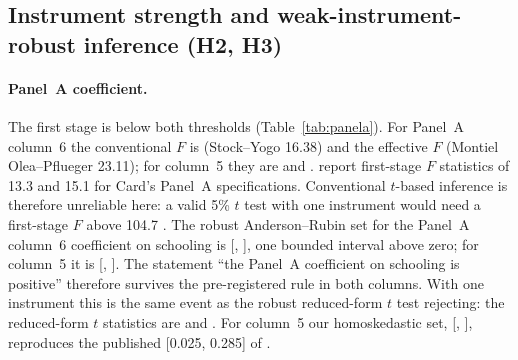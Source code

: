 \documentclass[11pt]{article}
\begin{document}
\subsection{Instrument strength and weak-instrument-robust inference (H2, H3)}
\label{sec:weakiv}




\paragraph{Panel~A coefficient.} The first stage is below both thresholds
(Table~\ref{tab:panela}). For Panel~A column~6 the conventional $F$ is \ASixFConv{}
(Stock--Yogo 16.38) and the effective $F$ \ASixFEff{} (Montiel Olea--Pflueger 23.11); for
column~5 they are \AFiveFConv{} and \AFiveFEff{}. \citet{bi2020inferring} report first-stage
$F$ statistics of 13.3 and 15.1 for Card's Panel~A specifications. Conventional %
$t$-based inference is therefore unreliable here: a valid 5\% $t$ test with one instrument
would need a first-stage $F$ above 104.7 \citep{lee2022valid}. The robust Anderson--Rubin set
for the Panel~A column~6 coefficient on schooling is [\ASixArLo, \ASixArHi], one bounded
interval above zero; for column~5 it is [\AFiveArLo, \AFiveArHi]. The statement ``the
Panel~A coefficient on schooling is positive'' therefore survives the pre-registered rule
in both columns. With one instrument this is the same event as the robust reduced-form $t$
test rejecting: the reduced-form $t$ statistics are \ASixRfTRobust{} and \AFiveRfTRobust{}.
For column~5 our homoskedastic set, [\AFiveArHomLo, \AFiveArHomHi], reproduces the
published [0.025, 0.285] of \citet{cinelli2025omitted}. %
\end{document}

